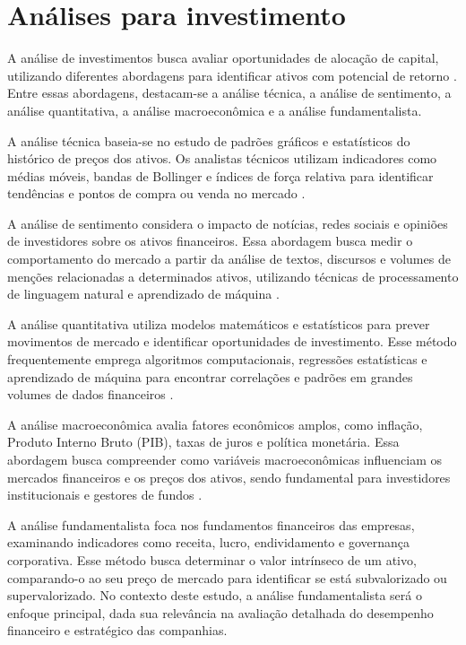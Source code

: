 \documentclass[recuosum=1.5cm]{iftex2024}
\begin{document}
\section{Análises para investimento} \label{sec:analises}

A análise de investimentos busca avaliar oportunidades de alocação de capital, utilizando diferentes abordagens para identificar ativos com potencial de retorno \cite{liaw:2011:business}. Entre essas abordagens, destacam-se a análise técnica, a análise de sentimento, a análise quantitativa, a análise macroeconômica e a análise fundamentalista.  

A análise técnica baseia-se no estudo de padrões gráficos e estatísticos do histórico de preços dos ativos. Os analistas técnicos utilizam indicadores como médias móveis, bandas de Bollinger e índices de força relativa para identificar tendências e pontos de compra ou venda no mercado \cite{omane:2019:time}.  

A análise de sentimento considera o impacto de notícias, redes sociais e opiniões de investidores sobre os ativos financeiros. Essa abordagem busca medir o comportamento do mercado a partir da análise de textos, discursos e volumes de menções relacionadas a determinados ativos, utilizando técnicas de processamento de linguagem natural e aprendizado de máquina \cite{kearney:2014:textual}.  

A análise quantitativa utiliza modelos matemáticos e estatísticos para prever movimentos de mercado e identificar oportunidades de investimento. Esse método frequentemente emprega algoritmos computacionais, regressões estatísticas e aprendizado de máquina para encontrar correlações e padrões em grandes volumes de dados financeiros \cite{sahu:2023:overview}.  

A análise macroeconômica avalia fatores econômicos amplos, como inflação, Produto Interno Bruto (PIB), taxas de juros e política monetária. Essa abordagem busca compreender como variáveis macroeconômicas influenciam os mercados financeiros e os preços dos ativos, sendo fundamental para investidores institucionais e gestores de fundos \cite{claessens:2017:macroeconomic}.  

A análise fundamentalista foca nos fundamentos financeiros das empresas, examinando indicadores como receita, lucro, endividamento e governança corporativa. Esse método busca determinar o valor intrínseco de um ativo, comparando-o ao seu preço de mercado para identificar se está subvalorizado ou supervalorizado. No contexto deste estudo, a análise fundamentalista será o enfoque principal, dada sua relevância na avaliação detalhada do desempenho financeiro e estratégico das companhias.  
\end{document}
